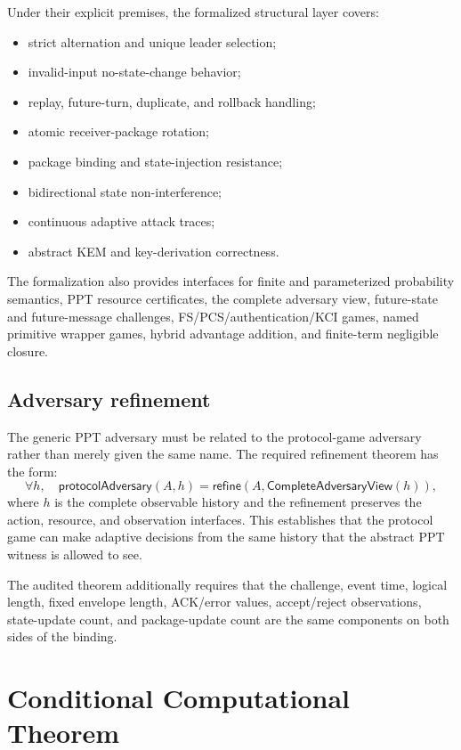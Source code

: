 \documentclass[11pt,letterpaper]{article}
\begin{document}
Under their explicit premises, the formalized structural layer covers:
\begin{itemize}[leftmargin=*]
  \item strict alternation and unique leader selection;
  \item invalid-input no-state-change behavior;
  \item replay, future-turn, duplicate, and rollback handling;
  \item atomic receiver-package rotation;
  \item package binding and state-injection resistance;
  \item bidirectional state non-interference;
  \item continuous adaptive attack traces;
  \item abstract KEM and key-derivation correctness.
\end{itemize}

The formalization also provides interfaces for finite and parameterized probability
semantics, PPT resource certificates, the complete adversary view, future-state and
future-message challenges, FS/PCS/authentication/KCI games, named primitive wrapper games,
hybrid advantage addition, and finite-term negligible closure.

\subsection{Adversary refinement}

The generic PPT adversary must be related to the protocol-game adversary rather than merely
given the same name. The required refinement theorem has the form:
\[
  \forall h,\quad
  \mathsf{protocolAdversary}(A,h)
  =\mathsf{refine}(A,\mathsf{CompleteAdversaryView}(h)),
\]
where $h$ is the complete observable history and the refinement preserves the action,
resource, and observation interfaces. This establishes that the protocol game can make
adaptive decisions from the same history that the abstract PPT witness is allowed to see.

The audited theorem additionally requires that the challenge, event time, logical length,
fixed envelope length, ACK/error values, accept/reject observations, state-update count,
and package-update count are the same components on both sides of the binding.

\section{Conditional Computational Theorem}
\label{sec:computational}
\end{document}
